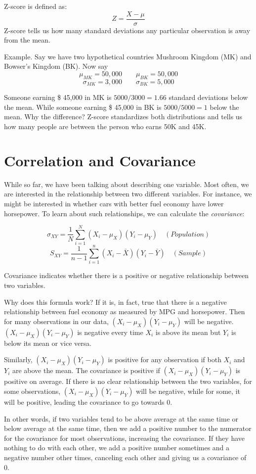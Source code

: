 \documentclass{./../../Latex/handout}
\begin{document}
Z-score is defined as:
$$ Z = \frac{X - \mu}{\sigma} $$
Z-score tells us how many standard deviations any particular observation is away from the mean.

Example. Say we have two hypothetical countries Mushroom Kingdom (MK) and Bowser's Kingdom (BK). Now say $$ \mu_{MK} = 50,000 \quad \quad  \mu_{BK} = 50,000 $$
$$ \sigma_{MK} = 3,000 \quad \quad  \sigma_{BK} = 5,000 $$

Someone earning \$ 45,000 in MK is $5000/ 3000 =1.66$ standard deviations below the mean. While someone earning \$ 45,000 in BK is $5000/ 5000 =1$ below the mean. Why the difference? Z-score standardizes both distributions and tells us how many people are between the person who earns 50K and 45K. 

\section{Correlation and Covariance}

While so far, we have been talking about describing one variable. Most often, we are interested in the relationship between two different variables. For instance, we might be interested in whether cars with better fuel economy have lower horsepower. To learn about such relationships, we can calculate the \textit{covariance}:

$$ \sigma_{XY} = \frac{1}{N}\sum_{i=1}^N (X_i-\mu_X)(Y_i-\mu_Y) \quad (Population) $$
$$ S_{XY} = \frac{1}{n-1}\sum_{i=1}^n (X_i-\bar{X})(Y_i-\bar{Y}) \quad (Sample) $$

Covariance indicates whether there is a positive or negative relationship between two variables. 

Why does this formula work? If it is, in fact, true that there is a negative relationship between fuel economy as measured by MPG and horsepower. Then for many observations in our data, $(X_i-\mu_X)(Y_i-\mu_Y)$ will be negative. $(X_i-\mu_X)(Y_i-\mu_Y)$ is negative every time $X_i$ is above its mean but $Y_i$ is below its mean or vice versa. 

Similarly, $(X_i-\mu_X)(Y_i-\mu_Y)$ is positive for any observation if both $X_i$ and $Y_i$ are above the mean. The covariance is positive if $(X_i-\mu_X)(Y_i-\mu_Y)$ is positive on average. If there is no clear relationship between the two variables, for some observations, $(X_i-\mu_X)(Y_i-\mu_Y)$ will be negative, while for some, it will be positive, leading the covariance to go towards 0. 

In other words, if two variables tend to be above average at the same time or below average at the same time, then we add a positive number to the numerator for the covariance for most observations, increasing the covariance. If they have nothing to do with each other, we add a positive number sometimes and a negative number other times, canceling each other and giving us a covariance of 0. 
\end{document}
